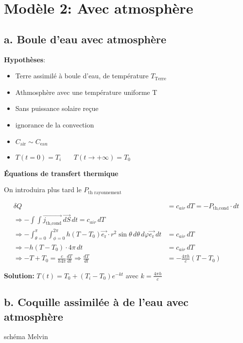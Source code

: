 \documentclass[a4paper,12pt]{article}
\begin{document}
\section{Modèle 2: Avec atmosphère}
\subsection{a. Boule d'eau avec atmosphère }
\textbf{Hypothèses}:
\begin{itemize}
    \item Terre assimilé à boule d'eau, de température \(T_{\text{Terre}}\) 
    \item  Athmosphère avec une température uniforme T 
    \item  Sans puissance solaire reçue  
    \item  ignorance de la convection  
    \item \(C_{\text{air}}\sim C_{\text{eau}}\) 
    \item $T(t=0) = T_i$ \ \ \
$T(t \to +\infty) = T_0$
   
\end{itemize}
\textbf{Équations de transfert thermique}

On introduira plus tard le \(P_{\text{th rayonnement}}\)

\begin{align*}
\delta Q &= c_{air}\, dT = -P_{\text{th,cond}} \cdot dt \\
\Rightarrow -\int \int \vec{j_{\text{th,cond}}}\, \vec{dS}\,dt = c_{air}\, dT \\
\Rightarrow -\int_{\theta=0}^\pi \int_{\phi=0}^{2\pi} h(T - T_0) \vec{e_{\text{r}}}\cdot r^2 \sin\theta\, d\theta\, d\varphi \vec{e_{\text{r}}}\, dt &=  c_{air}\, dT  \\
\Rightarrow -h(T - T_0) \cdot 4\pi\, dt &= c_{air}\, dT \\
\Rightarrow -T + T_0 = \frac{c}{h 4\pi} \frac{dT}{dt} \Rightarrow \frac{dT}{dt} &= -\frac{4\pi h}{c}(T - T_0)
\end{align*}

\vspace{0.5cm}

\textbf{Solution:} 
$T(t) = T_0 + (T_i - T_0)e^{-kt}$ \quad avec $k = \frac{4\pi h}{c}$

\subsection{b. Coquille assimilée à de l'eau avec atmosphère }
schéma Melvin
\end{document}
